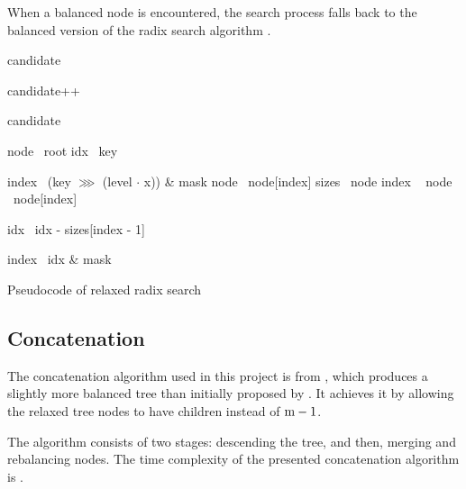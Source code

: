 When a balanced node is encountered, the search process falls back to the balanced version of the radix search algorithm .

\begin{listing}[!ht]

    \begin{algorithmic}[1]
            \State candidate 

                \State candidate++
            \EndIf

            \State \Return candidate
        \EndFunction

        \State

            \State node \la\ root
            \State idx \la\ key

                    \State index \la\ (key $\ggg$ (level $\cdot$ x)) \& mask
                    \State node \la\ node[index]
                \Else
                    \State sizes \la\ node
                    \State index \la\ 
                    \State node \la\ node[index]

                        \State idx \la\ idx - sizes[index - 1]
                    \EndIf
                \EndIf
            \EndFor

            \State index \la\ idx \& mask
            \State {}
        \EndFunction
    \end{algorithmic}

    \caption{Pseudocode of relaxed radix search}
    \label{lst:rrb-tree-relaxed-radix-search}
\end{listing}

\subsection{Concatenation}
The concatenation algorithm used in this project is from \cite{rrb-vector-practical-general-purpose-im-sequence}, which produces a slightly more balanced tree than initially proposed by \cite{efficient-immutable-vectors}. It achieves it by allowing the relaxed tree nodes to have \m{} children instead of $\m{} - 1$.

The algorithm consists of two stages: descending the tree, and then, merging and rebalancing nodes. The time complexity of the presented concatenation algorithm is .

